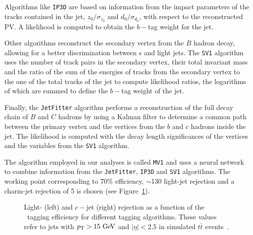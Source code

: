 Algorithms like \texttt{IP3D} are
based on information from the impact parameters of the tracks
contained in the jet, $z_0/\sigma_{z_0}$ and $d_0/\sigma_{d_0}$,
with respect to the reconstructed PV. 
A likelihood is computed to
obtain the $b-$tag weight for the jet.

Other algorithms reconstruct the secondary vertex from the $B$ hadron
decay, allowing for a better discrimination between \bjet s and light
jets. The \texttt{SV1} algorithm uses the number of track pairs in
the secondary vertex, their total invariant mass and the ratio of
the sum of the energies of tracks from the secondary vertex to the one
of the total tracks of the jet to compute likelihood ratios, the logarithms
of which are summed to define the $b-$tag weight of the jet.

Finally, the \texttt{JetFitter} algorithm performs a reconstruction
of the full decay chain of $B$ and $C$ hadrons by using a Kalman filter to determine a 
common path between the primary vertex and the vertices from the $b$ and $c$ hadrons 
inside the jet. The likelihood is computed with the decay length significances
of the vertices and the variables from the  \texttt{SV1} algorithm.

The algorithm employed in our analyses is called \texttt{MV1} and uses
a neural network to combine information from the \texttt{JetFitter}, \texttt{IP3D}
and \texttt{SV1} algorithms.
The working point corresponding to 70\% efficiency, 
$\sim$130 light-jet rejection and a charm-jet rejection of 5 is 
chosen (see Figure~\ref{fig:btageffs}).

\begin{figure}[tb]\begin{center}
	\caption{Light- (left) and $c-$jet (right) rejection as a function of the \bjet\ tagging efficiency
        for different tagging algorithms. These values refer to jets with $\pt >15\gev$ and 
$|\eta|<2.5$ in simulated $t\bar{t}$ events~\cite{btagging}.\label{fig:btageffs}}
\end{center}\end{figure}

